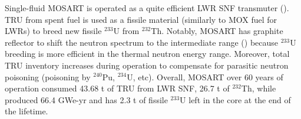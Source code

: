 \documentclass[letterpaper]{mandc2019}
\begin{document}
Single-fluid \gls{MOSART} is operated as a quite efficient \gls{LWR} \gls{SNF} transmuter (). TRU from spent fuel is used as a fissile material (similarly to \gls{MOX} fuel for \gls{LWR}s) to breed new fissile $^{233}$U from $^{232}$Th. Notably, \gls{MOSART} has graphite reflector to shift the neutron spectrum to the  intermediate range () because $^{233}$U breeding is more efficient in the thermal neutron energy range. Moreover, total TRU inventory increases  during operation to compensate for parasitic neutron poisoning (poisoning by $^{240}$Pu, $^{234}$U, etc). Overall, \gls{MOSART} over 60 years of operation consumed 43.68 t of TRU from \gls{LWR} \gls{SNF}, 26.7 t of $^{232}$Th, while produced 66.4 GWe-yr and has 2.3 t of fissile $^{233}$U left in the core at the end of the lifetime.
\end{document}
